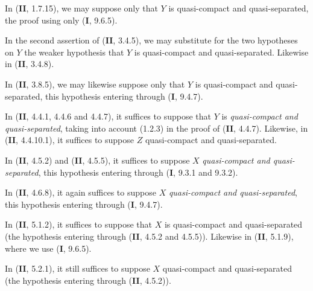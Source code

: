 \begin{env}[1.7.10]
\label{IV.1.7.10}
In (\textbf{II}, 1.7.15), we may suppose only that $Y$ is quasi-compact and
quasi-separated, the proof using only (\textbf{I}, 9.6.5).
\end{env}

\begin{env}[1.7.11]
\label{IV.1.7.11}
In the second assertion of (\textbf{II}, 3.4.5), we may substitute for the two
hypotheses on $Y$ the weaker hypothesis that $Y$ is quasi-compact and
quasi-separated. Likewise in (\textbf{II}, 3.4.8).
\end{env}

\begin{env}[1.7.12]
\label{IV.1.7.12}
In (\textbf{II}, 3.8.5), we may likewise suppose only that $Y$ is quasi-compact
and quasi-separated, this hypothesis entering through (\textbf{I}, 9.4.7).
\end{env}

\begin{env}[1.7.13]
\label{IV.1.7.13}
In (\textbf{II}, 4.4.1, 4.4.6 and 4.4.7), it suffices to suppose that $Y$ is
\emph{quasi-compact and quasi-separated}, taking into account (1.2.3) in the
proof of (\textbf{II}, 4.4.7). Likewise, in (\textbf{II}, 4.4.10.1), it suffices to
suppose $Z$ quasi-compact and quasi-separated.
\end{env}

\begin{env}[1.7.14]
\label{IV.1.7.14}
In (\textbf{II}, 4.5.2) and (\textbf{II}, 4.5.5), it suffices to suppose $X$
\emph{quasi-compact and quasi-separated}, this hypothesis entering through (\textbf{I},
9.3.1 and 9.3.2).
\end{env}

\begin{env}[1.7.15]
\label{IV.1.7.15}
In (\textbf{II}, 4.6.8), it again suffices to suppose $X$ \emph{quasi-compact and
quasi-separated}, this hypothesis entering through (\textbf{I}, 9.4.7).
\end{env}

\begin{env}[1.7.16]
\label{IV.1.7.16}
In (\textbf{II}, 5.1.2), it suffices to suppose that $X$ is quasi-compact and
quasi-separated (the hypothesis entering through (\textbf{II}, 4.5.2 and 4.5.5)).
Likewise in (\textbf{II}, 5.1.9), where we use (\textbf{I}, 9.6.5).
\end{env}

\begin{env}[1.7.17]
\label{IV.1.7.17}
In (\textbf{II}, 5.2.1), it still suffices to suppose $X$ quasi-compact and
quasi-separated (the hypothesis entering through (\textbf{II}, 4.5.2)).
\end{env}

